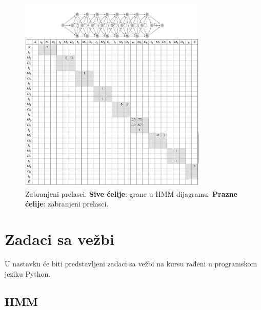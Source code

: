 \begin{figure}[H]
\centering
\includegraphics[width=0.8\textwidth]{poglavlja/10/slike/slika10.png}
\caption{Zabranjeni prelasci. \textbf{Sive ćelije}: grane u HMM dijagramu. \textbf{Prazne ćelije}: zabranjeni prelasci.}
\label{slika: 10}
\end{figure}

\section{Zadaci sa vežbi}

U nastavku će biti predstavljeni zadaci sa vežbi na kursu rađeni u programskom jeziku Python.

\subsection{HMM}


